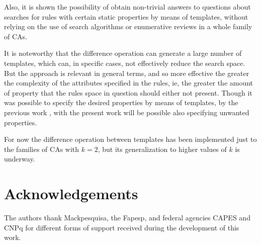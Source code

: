 \documentclass{llncs}
\begin{document}
Also, it is shown the possibility of obtain non-trivial answers to questions about searches for rules with certain static properties by means of templates, without relying on the use of search algorithms or enumerative reviews in a whole family of CAs.

It is noteworthy that the difference operation can generate a large number of templates, which can, in specific cases, not effectively reduce the search space. But the approach is relevant in general terms, and so more effective the greater the complexity of the attributes specified in the rules, ie, the greater the amount of property that the rules space in question should either not present. Though it was possible to specify the desired properties by means of templates, by the previous work \cite{deOliveira2014,deOliveira2014b}, with the present work will be possible also specifying unwanted properties.

For now the difference operation between templates has been implemented just to the families of CAs with $k=2$, but its generalization to higher values of $k$ is underway.

\section*{Acknowledgements}
\label{sec:agrdecimentos}
The authors thank Mackpesquisa, the Fapesp, and federal agencies CAPES and CNPq for different forms of support received during the development of this work.



\end{document}
